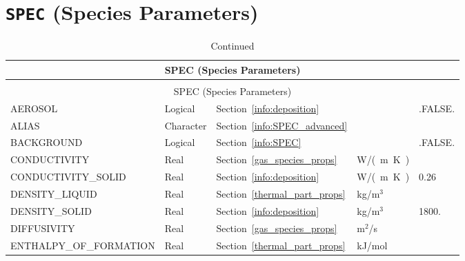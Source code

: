 \documentclass[11pt]{book}
\begin{document}

\vspace{\baselineskip}

\section{\texorpdfstring{{\tt SPEC}}{SPEC} (Species Parameters)}


\begin{longtable}{@{\extracolsep{\fill}}|l|l|l|l|l|}
\caption[Species parameters ({\ct SPEC} namelist group)]{For more information see Section~\ref{info:SPEC}.}
\label{tbl:SPEC} \\
\hline
\multicolumn{5}{|c|}{{\ct SPEC} (Species Parameters)} \\
\hline \hline
\endfirsthead
\caption[]{Continued} \\
\hline
\multicolumn{5}{|c|}{{\ct SPEC} (Species Parameters)} \\
\hline \hline
\endhead
{\ct AEROSOL}                       & Logical     & Section~\ref{info:deposition}           &                   & {\ct .FALSE.} \\ \hline
{\ct ALIAS}                         & Character   & Section~\ref{info:SPEC_advanced}        &                   &               \\ \hline
{\ct BACKGROUND}                    & Logical     & Section~\ref{info:SPEC}                 &                   & {\ct .FALSE.} \\ \hline
{\ct CONDUCTIVITY}                  & Real        & Section~\ref{gas_species_props}         & \si{W/(m.K)}      &               \\ \hline
{\ct CONDUCTIVITY\_SOLID}           & Real        & Section~\ref{info:deposition}           & \si{W/(m.K)}      &  0.26         \\ \hline
{\ct DENSITY\_LIQUID}               & Real        & Section~\ref{thermal_part_props}        & kg/m$^3$          &               \\ \hline
{\ct DENSITY\_SOLID}                & Real        & Section~\ref{info:deposition}           & kg/m$^3$          &  1800.        \\ \hline
{\ct DIFFUSIVITY}                   & Real        & Section~\ref{gas_species_props}         & m$^2$/s           &               \\ \hline
{\ct ENTHALPY\_OF\_FORMATION}       & Real        & Section~\ref{thermal_part_props}        & kJ/mol            &               \\ \hline

\end{longtable}
\end{document}
